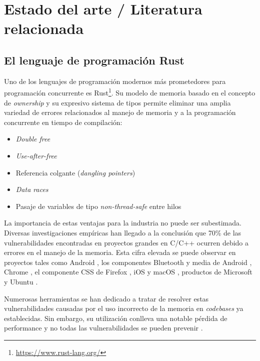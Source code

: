 \documentclass[12pt]{article}
\begin{document}
\bigskip

\section{Estado del arte / Literatura relacionada}

\subsection{El lenguaje de programación Rust}

Uno de los lenguajes de programación modernos más prometedores para programación concurrente es Rust\footnote{\url{https://www.rust-lang.org/}}.
Su modelo de memoria basado en el concepto de \textit{ownership} y su expresivo sistema de tipos permite eliminar una amplia variedad de
errores relacionados al manejo de memoria y a la programación concurrente en tiempo de compilación:

\begin{itemize}
    \item \textit{Double free} \cite[Cap. 4.1]{rust-book}
    \item \textit{Use-after-free} \cite[Cap. 4.1]{rust-book}
    \item Referencia colgante (\textit{dangling pointers}) \cite[Cap. 4.2]{rust-book}
    \item \textit{Data races} \cite[Cap. 4.2]{rust-book}
    \item Pasaje de variables de tipo \textit{non-thread-safe} entre hilos \cite[Cap. 16.4]{rust-book}
\end{itemize}

La importancia de estas ventajas para la industria no puede ser subestimada.
Diversas investigaciones empíricas han llegado a la conclusión que 70\% de las vulnerabilidades
encontradas en proyectos grandes en C/C++ ocurren debido a errores en el manejo de la memoria.
Esta cifra elevada se puede observar en proyectos tales como Android \cite{memory-bugs-android},
los componentes Bluetooth y media de Android \cite{memory-bugs-android-media-bluetooth},
Chrome \cite{memory-bugs-chrome}, el componente CSS de Firefox \cite{memory-bugs-firefox},
iOS y macOS \cite{memory-bugs-ios-macos}, productos de Microsoft \cite{miller-security-microsoft2019, memory-bugs-microsoft}
y Ubuntu \cite{memory-bugs-ubuntu}.

Numerosas herramientas se han dedicado a tratar de resolver estas vulnerabilidades causadas por el uso incorrecto de la memoria en \textit{codebases} ya establecidas.
Sin embargo, su utilización conlleva una notable pérdida de performance y no todas las vulnerabilidades se pueden prevenir \cite{szekeres2013}.
\end{document}
